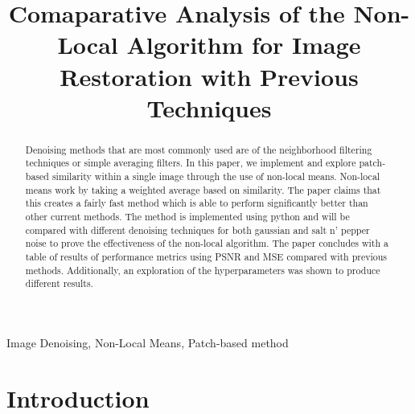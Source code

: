 \documentclass[conference]{IEEEtran}
\begin{document}
\title{Comaparative Analysis of the Non-Local Algorithm for Image Restoration with Previous Techniques}

\author{
}

\maketitle

\begin{abstract}
Denoising methods that are most commonly used are of the neighborhood filtering techniques or simple averaging filters. In this paper, we implement 
and explore patch-based similarity within a single image through the use of non-local means. Non-local means work by taking a weighted average based 
on similarity. The paper claims that this creates a fairly fast method which is able to perform significantly better than other current methods.
 The method is implemented using python and will be compared with different denoising techniques for both gaussian and salt n' pepper noise to prove the
 effectiveness of the non-local algorithm. The paper concludes with a table of results of performance metrics using PSNR and MSE compared with previous methods. 
 Additionally, an exploration of the hyperparameters was shown to produce different results.
\end{abstract}

\begin{IEEEkeywords}
Image Denoising, Non-Local Means, Patch-based method
\end{IEEEkeywords}

\section{Introduction}
\end{document}
